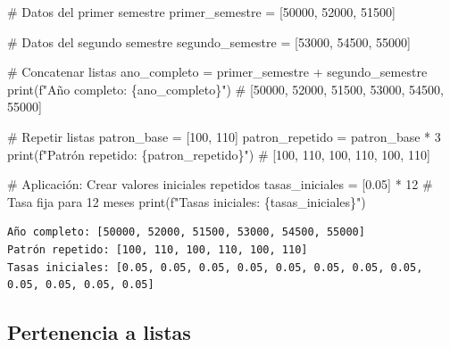 \documentclass[
  doc,
  floatsintext,
  longtable,
  a4paper,
  nolmodern,
  notxfonts,
  notimes,
  12pt,
  colorlinks=true,linkcolor=blue,citecolor=blue,urlcolor=blue]{apa7}
\newenvironment{Shaded}{\begin{snugshade}}{\end{snugshade}}
\newcommand{\BuiltInTok}[1]{\textcolor[rgb]{0.00,0.23,0.31}{#1}}
\newcommand{\CommentTok}[1]{\textcolor[rgb]{0.37,0.37,0.37}{#1}}
\newcommand{\DecValTok}[1]{\textcolor[rgb]{0.68,0.00,0.00}{#1}}
\newcommand{\FloatTok}[1]{\textcolor[rgb]{0.68,0.00,0.00}{#1}}
\newcommand{\NormalTok}[1]{\textcolor[rgb]{0.00,0.23,0.31}{#1}}
\newcommand{\OperatorTok}[1]{\textcolor[rgb]{0.37,0.37,0.37}{#1}}
\newcommand{\SpecialCharTok}[1]{\textcolor[rgb]{0.37,0.37,0.37}{#1}}
\newcommand{\SpecialStringTok}[1]{\textcolor[rgb]{0.13,0.47,0.30}{#1}}
\begin{document}
\begin{Shaded}
\begin{Highlighting}[]
\CommentTok{\# Datos del primer semestre}
\NormalTok{primer\_semestre }\OperatorTok{=}\NormalTok{ [}\DecValTok{50000}\NormalTok{, }\DecValTok{52000}\NormalTok{, }\DecValTok{51500}\NormalTok{]}

\CommentTok{\# Datos del segundo semestre}
\NormalTok{segundo\_semestre }\OperatorTok{=}\NormalTok{ [}\DecValTok{53000}\NormalTok{, }\DecValTok{54500}\NormalTok{, }\DecValTok{55000}\NormalTok{]}

\CommentTok{\# Concatenar listas}
\NormalTok{ano\_completo }\OperatorTok{=}\NormalTok{ primer\_semestre }\OperatorTok{+}\NormalTok{ segundo\_semestre}
\BuiltInTok{print}\NormalTok{(}\SpecialStringTok{f"Año completo: }\SpecialCharTok{\{}\NormalTok{ano\_completo}\SpecialCharTok{\}}\SpecialStringTok{"}\NormalTok{)}
\CommentTok{\# [50000, 52000, 51500, 53000, 54500, 55000]}

\CommentTok{\# Repetir listas}
\NormalTok{patron\_base }\OperatorTok{=}\NormalTok{ [}\DecValTok{100}\NormalTok{, }\DecValTok{110}\NormalTok{]}
\NormalTok{patron\_repetido }\OperatorTok{=}\NormalTok{ patron\_base }\OperatorTok{*} \DecValTok{3}
\BuiltInTok{print}\NormalTok{(}\SpecialStringTok{f"Patrón repetido: }\SpecialCharTok{\{}\NormalTok{patron\_repetido}\SpecialCharTok{\}}\SpecialStringTok{"}\NormalTok{)}
\CommentTok{\# [100, 110, 100, 110, 100, 110]}

\CommentTok{\# Aplicación: Crear valores iniciales repetidos}
\NormalTok{tasas\_iniciales }\OperatorTok{=}\NormalTok{ [}\FloatTok{0.05}\NormalTok{] }\OperatorTok{*} \DecValTok{12}  \CommentTok{\# Tasa fija para 12 meses}
\BuiltInTok{print}\NormalTok{(}\SpecialStringTok{f"Tasas iniciales: }\SpecialCharTok{\{}\NormalTok{tasas\_iniciales}\SpecialCharTok{\}}\SpecialStringTok{"}\NormalTok{)}
\end{Highlighting}
\end{Shaded}

\begin{verbatim}
Año completo: [50000, 52000, 51500, 53000, 54500, 55000]
Patrón repetido: [100, 110, 100, 110, 100, 110]
Tasas iniciales: [0.05, 0.05, 0.05, 0.05, 0.05, 0.05, 0.05, 0.05, 0.05, 0.05, 0.05, 0.05]
\end{verbatim}

\subsection{Pertenencia a listas}\label{pertenencia-a-listas}
\end{document}

